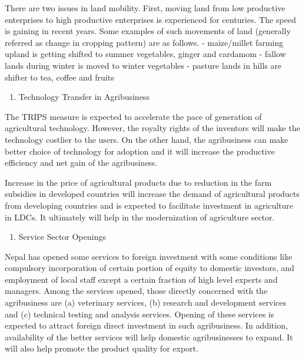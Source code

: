 \documentclass[
]{book}
\providecommand{\tightlist}{%
  \setlength{\itemsep}{0pt}\setlength{\parskip}{0pt}}
\begin{document}
There are two issues in land mobility. First, moving land from low productive enterprises to high productive enterprises is experienced for centuries. The speed is gaining in recent years. Some examples of such movements of land (generally referred as change in cropping pattern) are as follows.
- maize/millet farming upland is getting shifted to summer vegetables, ginger and cardamom
- fallow lands during winter is moved to winter vegetables
- pasture lands in hills are shifter to tea, coffee and fruits

\begin{enumerate}
\def\labelenumi{\arabic{enumi}.}
\setcounter{enumi}{5}
\tightlist
\item
  Technology Transfer in Agribusiness
\end{enumerate}

The TRIPS measure is expected to accelerate the pace of generation of agricultural technology. However, the royalty rights of the inventors will make the technology costlier to the users. On the other hand, the agribusiness can make better choice of technology for adoption and it will increase the productive efficiency and net gain of the agribusiness.

Increase in the price of agricultural products due to reduction in the farm subsidies in developed countries will increase the demand of agricultural products from developing countries and is expected to facilitate investment in agriculture in LDCs. It ultimately will help in the modernization of agriculture sector.

\begin{enumerate}
\def\labelenumi{\arabic{enumi}.}
\setcounter{enumi}{6}
\tightlist
\item
  Service Sector Openings
\end{enumerate}

Nepal has opened some services to foreign investment with some conditions like compulsory incorporation of certain portion of equity to domestic investors, and employment of local staff except a certain fraction of high level experts and managers. Among the services opened, those directly concerned with the agribusiness are (a) veterinary services, (b) research and development services and (c) technical testing and analysis services. Opening of these services is expected to attract foreign direct investment in such agribusiness. In addition, availability of the better services will help domestic agribusinesses to expand. It will also help promote the product quality for export.
\end{document}
